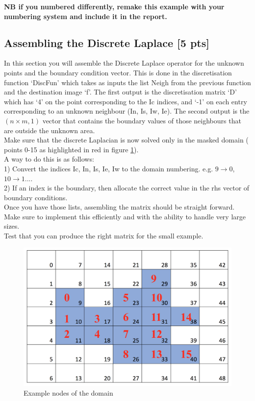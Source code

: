 \documentclass[paper=a4, fontsize=12pt]{scrartcl} %
\numberwithin{equation}{section}       %
\numberwithin{figure}{section}         %
\numberwithin{table}{section}          %
\begin{document}
\textbf{NB if you numbered differently, remake this example with your numbering system and include it in the report. }


\subsection{Assembling the Discrete Laplace [5 pts]}
In this section you will assemble the Discrete Laplace operator for the unknown points and the boundary condition vector. This is done in the discretisation function `DiscFun' which takes as inputs the list Neigh from the previous function and the destination image `f'.  The first output is the discretisation matrix `D' which has `4'  on the point corresponding to the Ic indices, and `-1' on each entry corresponding to an unknown neighbour (In, Is, Iw, Ie). The second output is the $( n \times m, 1)$ vector that contains the boundary values of those neighbours that are outside the unknown area. \\
Make sure that the discrete Laplacian is now solved only in the masked domain ( points 0-15 as highlighted in red in figure \ref{fig:tab2}). \\
A way to do this is as follows:\\

1) Convert the indices Ic, In, Is, Ie, Iw to the domain numbering.  e.g. $9\rightarrow 0$, $10\rightarrow1$....\\
2) If an index is the boundary, then allocate the correct value in the rhs vector of boundary conditions.\\

Once you have those lists, assembling the matrix should be straight forward.\\
Make sure to implement this efficiently and with the ability to handle very large sizes.\\
Test that you can produce the right matrix for the small example.

\begin{figure}[H]
    \centering
        \includegraphics[width=.5\textwidth]{Table_index}
    \caption{Example nodes of the domain}
    \label{fig:tab2}
\end{figure}
\end{document}
